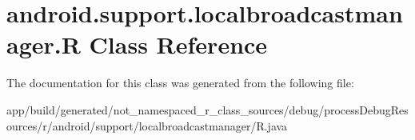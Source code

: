 \hypertarget{classandroid_1_1support_1_1localbroadcastmanager_1_1_r}{}\section{android.\+support.\+localbroadcastmanager.\+R Class Reference}
\label{classandroid_1_1support_1_1localbroadcastmanager_1_1_r}


The documentation for this class was generated from the following file\+:\begin{DoxyCompactItemize}
\item 
app/build/generated/not\+\_\+namespaced\+\_\+r\+\_\+class\+\_\+sources/debug/process\+Debug\+Resources/r/android/support/localbroadcastmanager/R.\+java\end{DoxyCompactItemize}
